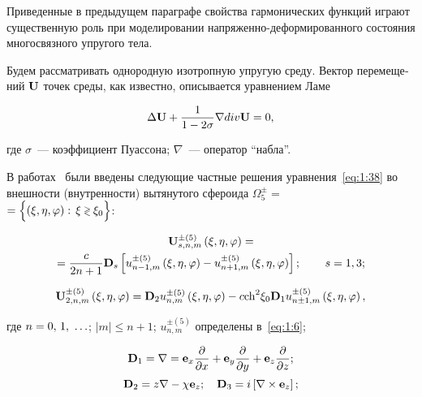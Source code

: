 \begin{russian}
Приведенные в предыдущем параграфе свойства гармонических функций играют существенную роль при моделировании на\-пря\-жен\-но-де\-фор\-ми\-ро\-ван\-но\-го состояния многосвязного упругого тела.

Будем рассматривать однородную изотропную упругую среду. Вектор перемещений ${\bf{U}}$ точек среды, как известно, описывается уравнением Ламе

\begin{equation}\label{eq:1:38}
\Delta {\bf{U}} + \frac{1}{{1 - 2\sigma }}\nabla div{\bf{U}} = 0,
\end{equation}

\noindent где $\sigma$~--- коэффициент Пуассона; $\nabla$~--- оператор ``набла''.

В работах~\cite{Nikolaev1993,Nikolaev1984} были введены следующие частные решения уравнения~\eqref{eq:1:38} во внешности (внутренности) вытянутого сфероида $\Omega _5^ \pm = $ \\ $= \Big\{ {(\xi ,\eta ,\varphi ): \- {\mkern 1mu} {\kern 1pt} \xi  \mathbin{\lower.3ex\hbox{$\buildrel>\over
{\smash{\scriptstyle<}\vphantom{_x}}$}} {\xi _0}} \Big\}$:

\begin{multline}\label{eq:1:39}
{\bf{U}}_{s,n,m}^{ \pm (5)}\left( {\xi ,\eta ,\varphi } \right) = \\
= \frac{c}{{2n + 1}}{{\bf{D}}_s}\left[ {u_{n - 1,m}^{ \pm (5)}\left( {\xi ,\eta ,\varphi } \right) - u_{n + 1,m}^{ \pm (5)}\left( {\xi ,\eta ,\varphi } \right)} \right];\qquad {\kern 1pt} s = 1,3;
\end{multline}

\begin{equation}\label{eq:1:40}
{\bf{U}}_{2,n,m}^{ \pm (5)}\left( {\xi ,\eta ,\varphi } \right) = {{\bf{D}}_2}u_{n,m}^{ \pm (5)}\left( {\xi ,\eta ,\varphi } \right) - c{{\mathop{\rm ch}\nolimits} ^2}{\xi _0}{{\bf{D}}_1}u_{n \pm 1,m}^{ \pm (5)}\left( {\xi ,\eta ,\varphi } \right),
\end{equation}

\noindent где $n = 0,{\mkern 1mu} {\kern 1pt} 1,{\mkern 1mu} {\kern 1pt}  \ldots $; $|m| \le n + 1$; $u_{n,m}^{ \pm (5)}$ определены в~\eqref{eq:1:6};

\begin{equation*}
{{\bf{D}}_1} = \nabla  = {{\bf{e}}_x}\frac{\partial }{{\partial x}} + {{\bf{e}}_y}\frac{\partial }{{\partial y}} + {{\bf{e}}_z}\frac{\partial }{{\partial z}};
\end{equation*}
\begin{equation}\label{eq:1:41}
{{\bf{D}}_2} = z\nabla  - \chi {{\bf{e}}_z};\quad {{\bf{D}}_3} = i\left[ {\nabla  \times {{\bf{e}}_z}} \right];
\end{equation}


\end{russian}
